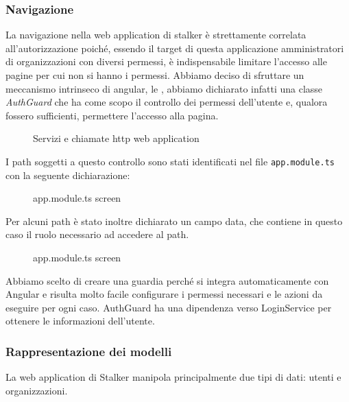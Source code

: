 \documentclass[../../manuale-manutentore.tex]{subfiles}
\begin{document}
\subsubsection{Navigazione}%
\label{subs:navigazione}

La navigazione nella web application di stalker è strettamente correlata all'autorizzazione poiché, essendo il target di questa applicazione amministratori di organizzazioni con diversi permessi, è indispensabile limitare l'accesso alle pagine per cui non si hanno i permessi.
Abbiamo deciso di sfruttare un meccanismo intrinseco di angular, le , abbiamo dichiarato infatti una classe \textit{AuthGuard} che ha come scopo il controllo dei permessi dell'utente e, qualora fossero sufficienti, permettere l'accesso alla pagina.
\begin{figure}[H]
  \centering
  \caption{Servizi e chiamate http web application}%
  \label{fig:web-app-authguard}
\end{figure}
I path soggetti a questo controllo sono stati identificati nel file \texttt{app.module.ts} con la seguente dichiarazione:
\begin{figure}[H]
  \centering
  \caption{app.module.ts screen}%
  \label{fig:web-app-authguard}
\end{figure}

Per alcuni path è stato inoltre dichiarato un campo data, che contiene in questo caso il ruolo necessario ad accedere al path.
\begin{figure}[H]
  \centering
  \caption{app.module.ts screen}%
  \label{fig:web-app-authguard}
\end{figure}
Abbiamo scelto di creare una guardia perché si integra automaticamente con Angular e risulta molto facile configurare i permessi necessari e le azioni da eseguire per ogni caso.
AuthGuard ha una dipendenza verso LoginService per ottenere le informazioni dell'utente.


\subsubsection{Rappresentazione dei modelli}%
\label{subs:modelli}

La web application di Stalker manipola principalmente due tipi di dati: utenti e organizzazioni.
\end{document}
